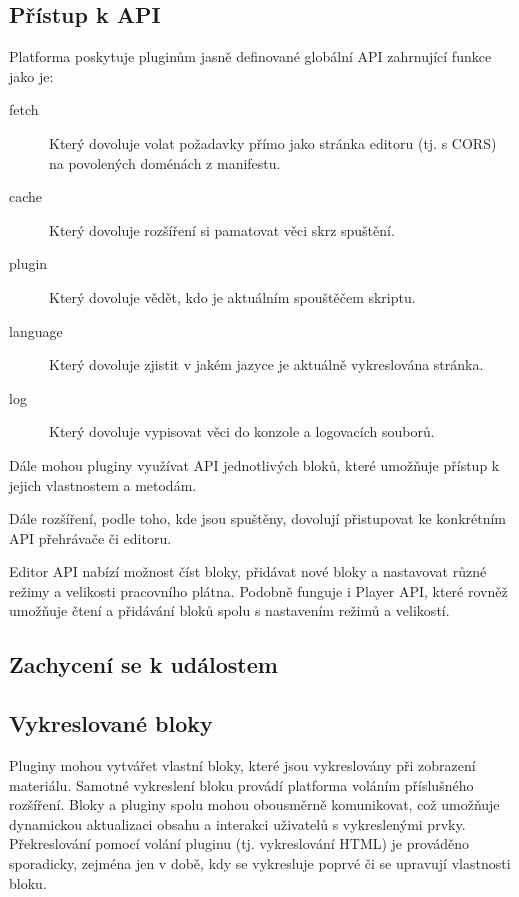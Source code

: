 \subsection{Přístup k API}

Platforma poskytuje pluginům jasně definované globální API zahrnující funkce jako je:

\begin{description}
    \item[fetch] Který dovoluje volat požadavky přímo jako stránka editoru (tj. s CORS) na povolených doménách z manifestu.
    \item[cache] Který dovoluje rozšíření si pamatovat věci skrz spuštění.
    \item[plugin] Který dovoluje vědět, kdo je aktuálním spouštěčem skriptu.
    \item[language] Který dovoluje zjistit v jakém jazyce je aktuálně vykreslována stránka.
    \item[log] Který dovoluje vypisovat věci do konzole a logovacích souborů.
\end{description}

Dále mohou pluginy využívat API jednotlivých bloků, které umožňuje přístup k jejich vlastnostem a metodám.

Dále rozšíření, podle toho, kde jsou spuštěny, dovolují přistupovat ke konkrétním API přehrávače či editoru.

Editor API nabízí možnost číst bloky, přidávat nové bloky a nastavovat různé režimy a velikosti pracovního plátna. Podobně funguje i Player API, které rovněž umožňuje čtení a přidávání bloků spolu s nastavením režimů a velikostí.

\subsection{Zachycení se k událostem}

\subsection{Vykreslované bloky}

Pluginy mohou vytvářet vlastní bloky, které jsou vykreslovány při zobrazení materiálu. 
Samotné vykreslení bloku provádí platforma voláním příslušného rozšíření. 
Bloky a pluginy spolu mohou obousměrně komunikovat, což umožňuje dynamickou aktualizaci obsahu a interakci uživatelů s vykreslenými prvky.
Překreslování pomocí volání pluginu (tj. vykreslování HTML) je prováděno sporadicky, zejména jen v době, kdy se vykresluje poprvé či se upravují vlastnosti bloku.

